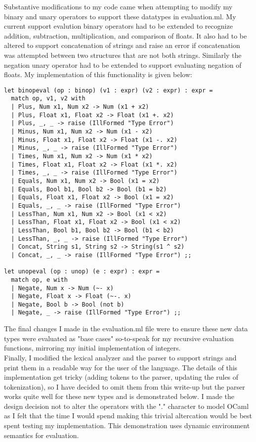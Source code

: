 \documentclass[12pt]{article}
\theoremstyle{definition}
\begin{document}
Substantive modifications to my code came when attempting to modify my binary and unary operators to support these datatypes in evaluation.ml. My current support evalution binary operators had to be extended to recognize addition, subtraction, multiplication, and comparison of floats. It also had to be altered to support concatenation of strings and raise an error if concatenation was attempted between two structures that are not both strings. Similarly the negation unary operator had to be extended to support evaluating negation of floats. My implementation of this functionality is given below: 
\newpage
\begin{verbatim}
let binopeval (op : binop) (v1 : expr) (v2 : expr) : expr =
  match op, v1, v2 with
  | Plus, Num x1, Num x2 -> Num (x1 + x2)
  | Plus, Float x1, Float x2 -> Float (x1 +. x2)
  | Plus, _, _ -> raise (IllFormed "Type Error")
  | Minus, Num x1, Num x2 -> Num (x1 - x2)
  | Minus, Float x1, Float x2 -> Float (x1 -. x2)
  | Minus, _, _ -> raise (IllFormed "Type Error")
  | Times, Num x1, Num x2 -> Num (x1 * x2) 
  | Times, Float x1, Float x2 -> Float (x1 *. x2) 
  | Times, _, _ -> raise (IllFormed "Type Error")
  | Equals, Num x1, Num x2 -> Bool (x1 = x2)
  | Equals, Bool b1, Bool b2 -> Bool (b1 = b2)
  | Equals, Float x1, Float x2 -> Bool (x1 = x2) 
  | Equals, _, _ -> raise (IllFormed "Type Error")
  | LessThan, Num x1, Num x2 -> Bool (x1 < x2)
  | LessThan, Float x1, Float x2 -> Bool (x1 < x2)
  | LessThan, Bool b1, Bool b2 -> Bool (b1 < b2)
  | LessThan, _, _ -> raise (IllFormed "Type Error")
  | Concat, String s1, String s2 -> String(s1 ^ s2)
  | Concat, _, _ -> raise (IllFormed "Type Error") ;;

let unopeval (op : unop) (e : expr) : expr = 
  match op, e with 
  | Negate, Num x -> Num (~- x)
  | Negate, Float x -> Float (~-. x)
  | Negate, Bool b -> Bool (not b)
  | Negate, _ -> raise (IllFormed "Type Error") ;;
\end{verbatim}

The final changes I made in the evaluation.ml file were to ensure these new data types were evaluated as "base cases" so-to-speak for my recursive evaluation functions, mirroring my initial implementation of integers.\\

Finally, I modified the lexical analyzer and the parser to support strings and print them in a readable way for the user of the language. The details of this implementation get tricky (adding tokens to the parser, updating the rules of tokenization), so I have decided to omit them from this write-up but the parser works quite well for these new types and is demonstrated below. I made the design decision not to alter the operators with the "." character to model OCaml as I felt that the time I would spend making this trivial altercation would be best spent testing my implementation. This demonstration uses dynamic environment semantics for evaluation.
\end{document}
